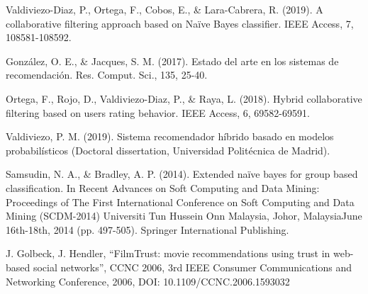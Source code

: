 \documentclass[twocolumn, fontsize=10pt]{article}
\begin{document}
\begin{thebibliography}{}

    Valdiviezo-Diaz, P., Ortega, F., Cobos, E., \& Lara-Cabrera, R. (2019). A collaborative filtering approach based on Naïve Bayes classifier. IEEE Access, 7, 108581-108592.
    
    González, O. E., \& Jacques, S. M. (2017). Estado del arte en los sistemas de recomendación. Res. Comput. Sci., 135, 25-40.
    
    Ortega, F., Rojo, D., Valdiviezo-Diaz, P., \& Raya, L. (2018). Hybrid collaborative filtering based on users rating behavior. IEEE Access, 6, 69582-69591.
    
    Valdiviezo, P. M. (2019). Sistema recomendador híbrido basado en modelos probabilísticos (Doctoral dissertation, Universidad Politécnica de Madrid).

    Samsudin, N. A., \& Bradley, A. P. (2014). Extended naïve bayes for group based classification. In Recent Advances on Soft Computing and Data Mining: Proceedings of The First International Conference on Soft Computing and Data Mining (SCDM-2014) Universiti Tun Hussein Onn Malaysia, Johor, MalaysiaJune 16th-18th, 2014 (pp. 497-505). Springer International Publishing.

    J. Golbeck, J. Hendler, “FilmTrust: movie recommendations using trust in web-based social networks”, CCNC 2006, 3rd IEEE Consumer Communications and Networking Conference, 2006, DOI: 10.1109/CCNC.2006.1593032 
    
\end{thebibliography}
    
    
\end{document}
